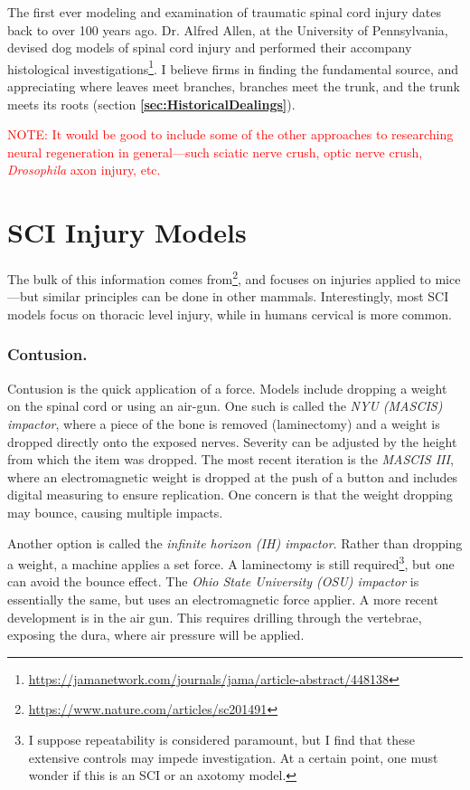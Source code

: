 The first ever modeling and examination of traumatic spinal cord injury dates back to over 100 years ago. Dr. Alfred Allen, at the University of Pennsylvania, devised dog models of spinal cord injury and performed their accompany histological investigations\footnote{\url{https://jamanetwork.com/journals/jama/article-abstract/448138}}. I believe firms in finding the fundamental source, and appreciating where leaves meet branches, branches meet the trunk, and the trunk meets its roots (section \textbf{\ref{sec:HistoricalDealings}}).\newline

\textcolor{red}{NOTE: It would be good to include some of the other approaches to researching neural regeneration in general---such sciatic nerve crush, optic nerve crush, \textit{Drosophila} axon injury, etc.}

\section{SCI Injury Models}
The bulk of this information comes from\footnote{\url{https://www.nature.com/articles/sc201491}}, and focuses on injuries applied to mice---but similar principles can be done in other mammals. Interestingly, most SCI models focus on thoracic level injury, while in humans cervical is more common. 

\subsubsection{Contusion.}
Contusion is the quick application of a force. Models include dropping a weight on the spinal cord or using an air-gun. One such is called the \textit{NYU (MASCIS) impactor}, where a piece of the bone is removed (laminectomy) and a weight is dropped directly onto the exposed nerves. Severity can be adjusted by the height from which the item was dropped. The most recent iteration is the \textit{MASCIS III}, where an electromagnetic weight is dropped at the push of a button and includes digital measuring to ensure replication. One concern is that the weight dropping may bounce, causing multiple impacts.\newline

Another option is called the \textit{infinite horizon (IH) impactor}. Rather than dropping a weight, a machine applies a set force. A laminectomy is still required\footnote{I suppose repeatability is considered paramount, but I find that these extensive controls may impede investigation. At a certain point, one must wonder if this is an SCI or an axotomy model.}, but one can avoid the bounce effect. The \textit{Ohio State University (OSU) impactor} is essentially the same, but uses an electromagnetic force applier. A more recent development is in the air gun. This requires drilling through the vertebrae, exposing the dura, where air pressure will be applied. 



